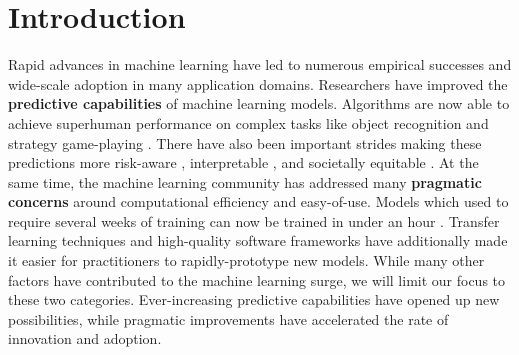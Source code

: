 \chapter{Introduction}
\label{chapt:introduction}









Rapid advances in machine learning have led to numerous empirical successes and wide-scale adoption in many application domains.
Researchers have improved the {\bf predictive capabilities} of machine learning models.
Algorithms are now able to achieve superhuman performance on complex tasks like object recognition \cite{} and strategy game-playing \cite{}.
There have also been important strides making these predictions more risk-aware \cite{}, interpretable \cite{}, and societally equitable \cite{}.
At the same time, the machine learning community has addressed many {\bf pragmatic concerns} around computational efficiency and easy-of-use.
Models which used to require several weeks of training can now be trained in under an hour \cite{goyal2017accurate}.
Transfer learning techniques and high-quality software frameworks have additionally made it easier for practitioners to rapidly-prototype new models.
While many other factors have contributed to the machine learning surge, we will limit our focus to these two categories.
Ever-increasing predictive capabilities have opened up new possibilities, while pragmatic improvements have accelerated the rate of innovation and adoption.

